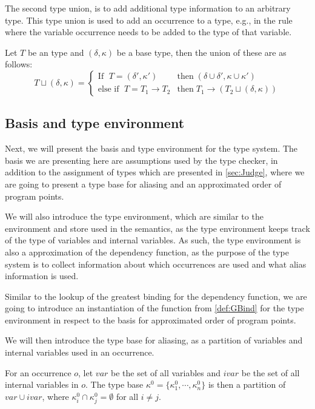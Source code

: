 \documentclass[../../master.tex]{subfiles}
\begin{document}
The second type union, is to add additional type information to an arbitrary type.
This type union is used to add an occurrence to a type, e.g., in the  rule where the variable occurrence needs to be added to the type of that variable.
\begin{definition}
	Let $T$ be an type and $(\delta,\kappa)$ be a base type, then the union of these are as follows:
	\begin{equation*}
		T\sqcup (\delta,\kappa)=
		\left\{\begin{matrix}
			\mbox{If } \; T=(\delta',\kappa')  & \mbox{then} \; (\delta\cup\delta',\kappa\cup\kappa')\\
			\mbox{else if } \; T=T_1\rightarrow T_2 & \mbox{then} \; T_1\rightarrow(T_2\sqcup (\delta,\kappa))
		\end{matrix}\right.
	\end{equation*}
\end{definition}

\subsection{Basis and type environment}\label{sec:basis}
Next, we will present the basis and type environment for the type system.
The basis we are presenting here are assumptions used by the type checker, in addition to the assignment of types which are presented in \cref{sec:Judge}, where we are going to present a type base for aliasing and an approximated order of program points.

We will also introduce the type environment, which are similar to the environment and store used in the semantics, as the type environment keeps track of the type of variables and internal variables.
As such, the type environment is also a approximation of the dependency function, as the purpose of the type system is to collect information about which occurrences are used and what alias information is used.

Similar to the lookup of the greatest binding for the dependency function, we are going to introduce an instantiation of the function from \cref{def:GBind} for the type environment in respect to the basis for approximated order of program points.
\bigskip

We will then introduce the type base for aliasing, as a partition of variables and internal variables used in an occurrence.

\begin{definition}
	For an occurrence $o$, let $var$ be the set of all variables and $ivar$ be the set of all internal variables in $o$.
	The type base $\kappa^0=\{\kappa^0_1,\cdots,\kappa^0_n\}$ is then a partition of $var\cup ivar$, where $\kappa_i^0\cap\kappa_j^0=\emptyset$ for all $i\neq j$.
\end{definition}
\end{document}

